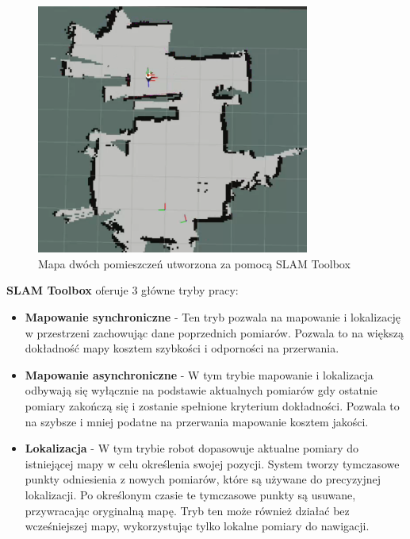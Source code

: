 \documentclass[a4paper,twoside,12pt]{book}
\begin{document}
\begin{figure}[h]
	\centering
	\includegraphics[width=0.8\textwidth]{images/sklep.png}
	\caption{Mapa dwóch pomieszczeń utworzona za pomocą SLAM Toolbox \cite{bib:slamtoolbox}}
	\label{fig:sklep}
	\end{figure}
\newpage
\textbf{SLAM Toolbox} oferuje 3 główne tryby pracy:
\begin{itemize}
	\item \textbf{Mapowanie synchroniczne} - Ten tryb pozwala na mapowanie i lokalizację w przestrzeni zachowując dane poprzednich pomiarów. Pozwala to na większą dokładność mapy kosztem szybkości i odporności na przerwania.
	\item \textbf{Mapowanie asynchroniczne} - W tym trybie mapowanie i lokalizacja odbywają się wyłącznie na podstawie aktualnych pomiarów gdy ostatnie pomiary zakończą się i zostanie spełnione kryterium dokładności. Pozwala to na szybsze i mniej podatne na przerwania mapowanie kosztem jakości.
	\item \textbf{Lokalizacja} - W tym trybie robot dopasowuje aktualne pomiary do istniejącej mapy w celu określenia swojej pozycji. System tworzy tymczasowe punkty odniesienia z nowych pomiarów, które są używane do precyzyjnej lokalizacji. Po określonym czasie te tymczasowe punkty są usuwane, przywracając oryginalną mapę. Tryb ten może również działać bez wcześniejszej mapy, wykorzystując tylko lokalne pomiary do nawigacji.
\end{itemize}
\end{document}
